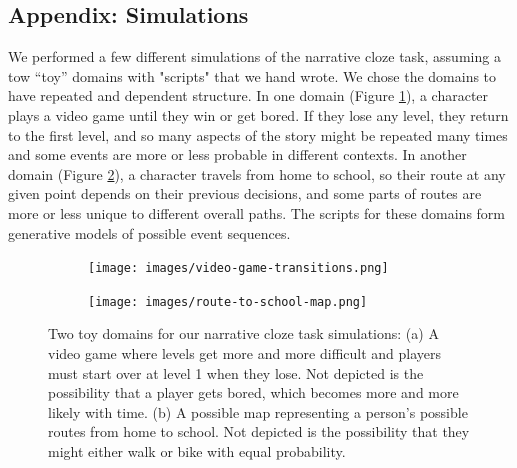 \documentclass[10pt,a4paper]{article}
\newcommand{\todo}[1]{{\color{red}#1}}
\begin{document}





\setlength{\bibleftmargin}{.125in}
\setlength{\bibindent}{-\bibleftmargin}



\subsection{Appendix: Simulations \label{appendix}}

We performed a few different simulations of the narrative cloze task, assuming a tow ``toy'' domains with "scripts" that we hand wrote. We chose the domains to have repeated and dependent structure. In one domain (Figure \ref{fig:video-game-script}), a character plays a video game until they win or get bored. If they lose any level, they return to the first level, and so many aspects of the story might be repeated many times and some events are more or less probable in different contexts. In another domain (Figure \ref{fig:route-to-school-script}), a character travels from home to school, so their route at any given point depends on their previous decisions, and some parts of routes are more or less unique to different overall paths. The scripts for these domains form generative models of possible event sequences.

\begin{figure}
 \centering
 \begin{subfigure}{0.45\linewidth}
  \centering
  \texttt{[image: images/video-game-transitions.png]}
  \caption{}
  \label{fig:video-game-script}
 \end{subfigure}
 \begin{subfigure}{0.45\linewidth}
  \centering
  \texttt{[image: images/route-to-school-map.png]}
  \caption{}
  \label{fig:route-to-school-script}
 \end{subfigure}
 \caption{Two toy domains for our narrative cloze task simulations: (a) A video game where levels get more and more difficult and players must start over at level 1 when they lose. Not depicted is the possibility that a player gets bored, which becomes more and more likely with time. (b) A possible map representing a person's possible routes from home to school. Not depicted is the possibility that they might either walk or bike with equal probability.}
 \label{fig:scripts}
\end{figure}
\end{document}
